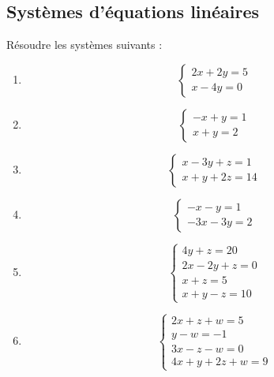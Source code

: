 \documentclass[11pt,a4paper]{report}
\begin{document}
\vspace{2em}
\subsection{Systèmes d'équations linéaires}
Résoudre les systèmes suivants :

\begin{multicols}{3}
\begin{enumerate}[label={}]
  \item 
  $$\begin{cases}
    2x + 2y = 5 \\
      x - 4y = 0
    \end{cases}$$

  \item 
    $$\begin{cases}
      -x + y = 1 \\
      x + y = 2
    \end{cases}$$

  \item 
  $$\begin{cases}
      x - 3y + z = 1 \\
      x + y + 2z = 14
    \end{cases}$$


  \item 
  $$\begin{cases}
      -x - y = 1 \\
      -3x - 3y = 2
    \end{cases}$$


  \item 
  $$\begin{cases}
      4y + z = 20 \\
      2x - 2y + z = 0 \\
      x + z = 5 \\
      x + y - z = 10
    \end{cases}$$


  \item 
  $$\begin{cases}
      2x + z + w = 5 \\
      y - w = -1 \\
      3x - z - w = 0 \\
      4x + y + 2z + w = 9
    \end{cases}$$

\end{enumerate}
\end{multicols}

\vspace{2em}
\end{document}
